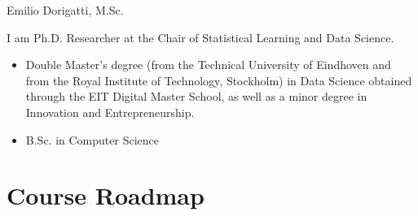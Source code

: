 \begin{frame}  {Emilio Dorigatti, M.Sc.}

 I am Ph.D. Researcher at the Chair of Statistical Learning and Data Science.
    \begin{itemize}
      \item Double Master's degree (from the Technical University of Eindhoven and from the Royal Institute of Technology, Stockholm) in Data Science obtained through the EIT Digital Master School, as well as a minor degree in Innovation and Entrepreneurship.
      \item B.Sc. in Computer Science
    \end{itemize}
    
  \begin{figure}
    \centering

  \end{figure}
  
\end{frame}



\section{Course Roadmap}

